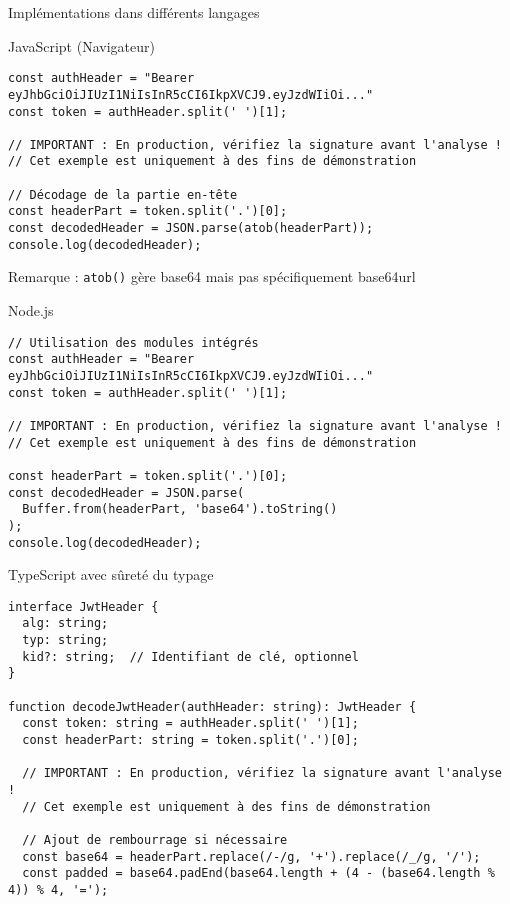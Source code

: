 \documentclass[presentation,aspectratio=169]{beamer}
\begin{document}
\begin{frame}[label={sec:org25093b4},fragile]{Implémentations dans différents langages}
 \begin{block}{JavaScript (Navigateur) 🧩}
\begin{verbatim}
const authHeader = "Bearer eyJhbGciOiJIUzI1NiIsInR5cCI6IkpXVCJ9.eyJzdWIiOi..."
const token = authHeader.split(' ')[1];

// IMPORTANT : En production, vérifiez la signature avant l'analyse !
// Cet exemple est uniquement à des fins de démonstration

// Décodage de la partie en-tête
const headerPart = token.split('.')[0];
const decodedHeader = JSON.parse(atob(headerPart));
console.log(decodedHeader);
\end{verbatim}

\alert{Remarque} : \texttt{atob()} gère base64 mais pas spécifiquement base64url
\end{block}
\begin{block}{Node.js 🧩}
\begin{verbatim}
// Utilisation des modules intégrés
const authHeader = "Bearer eyJhbGciOiJIUzI1NiIsInR5cCI6IkpXVCJ9.eyJzdWIiOi..."
const token = authHeader.split(' ')[1];

// IMPORTANT : En production, vérifiez la signature avant l'analyse !
// Cet exemple est uniquement à des fins de démonstration

const headerPart = token.split('.')[0];
const decodedHeader = JSON.parse(
  Buffer.from(headerPart, 'base64').toString()
);
console.log(decodedHeader);
\end{verbatim}
\end{block}
\begin{block}{TypeScript avec sûreté du typage 🧩}
\begin{verbatim}
interface JwtHeader {
  alg: string;
  typ: string;
  kid?: string;  // Identifiant de clé, optionnel
}

function decodeJwtHeader(authHeader: string): JwtHeader {
  const token: string = authHeader.split(' ')[1];
  const headerPart: string = token.split('.')[0];

  // IMPORTANT : En production, vérifiez la signature avant l'analyse !
  // Cet exemple est uniquement à des fins de démonstration

  // Ajout de rembourrage si nécessaire
  const base64 = headerPart.replace(/-/g, '+').replace(/_/g, '/');
  const padded = base64.padEnd(base64.length + (4 - (base64.length % 4)) % 4, '=');


\end{verbatim}
\end{block}
\end{frame}
\end{document}
